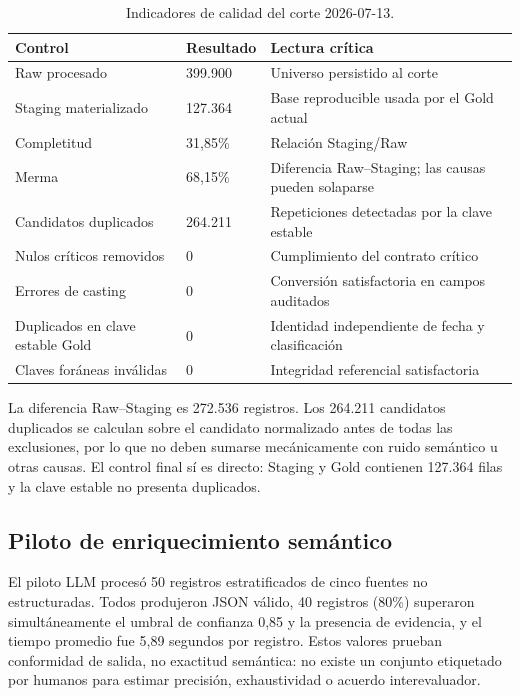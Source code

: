 \documentclass[12pt,a4paper]{article}
\begin{document}
\begin{table}[H]
\centering
\small
{}
\begin{tabularx}{\textwidth}{Y P{3.0cm} Y}
\toprule
{}
\textbf{Control} & \textbf{Resultado} & \textbf{Lectura crítica} \\
\midrule
Raw procesado & 399.900 & Universo persistido al corte \\
Staging materializado & 127.364 & Base reproducible usada por el Gold actual \\
Completitud & 31,85\% & Relación Staging/Raw \\
Merma & 68,15\% & Diferencia Raw--Staging; las causas pueden solaparse \\
Candidatos duplicados & 264.211 & Repeticiones detectadas por la clave estable \\
Nulos críticos removidos & 0 & Cumplimiento del contrato crítico \\
Errores de casting & 0 & Conversión satisfactoria en campos auditados \\
Duplicados en clave estable Gold & 0 & Identidad independiente de fecha y clasificación \\
Claves foráneas inválidas & 0 & Integridad referencial satisfactoria \\
\bottomrule
\end{tabularx}
\caption{Indicadores de calidad del corte 2026-07-13.}
\end{table}

La diferencia Raw--Staging es 272.536 registros. Los 264.211 candidatos duplicados se calculan sobre el candidato normalizado antes de todas las exclusiones, por lo que no deben sumarse mecánicamente con ruido semántico u otras causas. El control final sí es directo: Staging y Gold contienen 127.364 filas y la clave estable no presenta duplicados.

\subsection{Piloto de enriquecimiento semántico}

El piloto LLM procesó 50 registros estratificados de cinco fuentes no estructuradas. Todos produjeron JSON válido, 40 registros (80\%) superaron simultáneamente el umbral de confianza 0,85 y la presencia de evidencia, y el tiempo promedio fue 5,89 segundos por registro. Estos valores prueban conformidad de salida, no exactitud semántica: no existe un conjunto etiquetado por humanos para estimar precisión, exhaustividad o acuerdo interevaluador.
\end{document}
